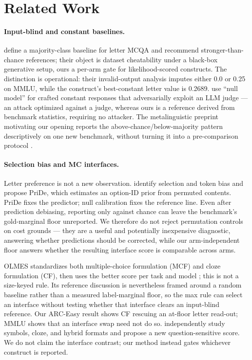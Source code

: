 \section{Related Work}

\paragraph{Input-blind and constant baselines.}
\citet{balepur2024artifacts} define a majority-class baseline for letter MCQA and recommend stronger-than-chance references; their object is dataset cheatability under a black-box generative setup, ours a per-arm gate for likelihood-scored constructs. The distinction is operational: their invalid-output analysis imputes either 0.0 or 0.25 on MMLU, while the construct's best-constant letter value is 0.2689. \citet{zheng2025cheating} use ``null model'' for crafted constant responses that adversarially exploit an LLM judge --- an attack optimized against a judge, whereas ours is a reference derived from benchmark statistics, requiring no attacker. The metalinguistic preprint motivating our opening reports the above-chance/below-majority pattern descriptively on one new benchmark, without turning it into a pre-comparison protocol \citep{arcon2026metalinguistic}.

\paragraph{Selection bias and MC interfaces.}
Letter preference is not a new observation. \citet{zheng2024selectors} identify selection and token bias and propose PriDe, which estimates an option-ID prior from permuted contents. PriDe fixes the predictor; null calibration fixes the reference line. Even after prediction debiasing, reporting only against chance can leave the benchmark's gold-marginal floor unreported. We therefore do not reject permutation controls on cost grounds --- they are a useful and potentially inexpensive diagnostic, answering whether predictions should be corrected, while our arm-independent floor answers whether the resulting interface score is comparable across arms.

OLMES standardizes both multiple-choice formulation (MCF) and cloze formulation (CF), then uses the better score per task and model \citep{gu2025olmes}; this is not a size-keyed rule. Its reference discussion is nevertheless framed around a random baseline rather than a measured label-marginal floor, so the max rule can select an interface without testing whether that interface clears an input-blind reference. Our ARC-Easy result shows CF rescuing an at-floor letter read-out; MMLU shows that an interface swap need not do so. \citet{cho2026choices} independently study symbols, cloze, and hybrid formats and propose a new question-sensitive score. We do not claim the interface contrast; our method instead gates whichever construct is reported.

